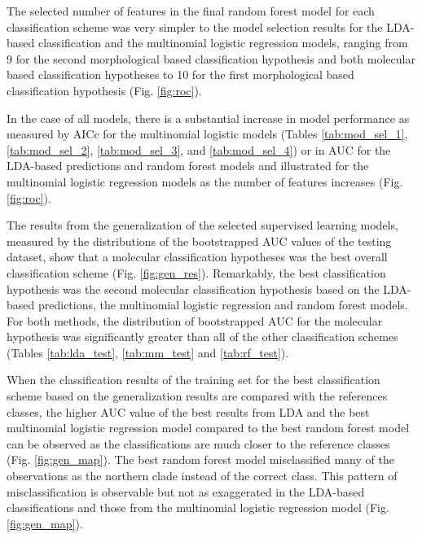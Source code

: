\documentclass[12pt,letterpaper]{article}\usepackage{graphicx, color}
\begin{document}



The selected number of features in the final random forest model for each classification scheme was very simpler to the model selection results for the LDA-based classification and the multinomial logistic regression models, ranging from 9 for the second morphological based classification hypothesis and both molecular based classification hypotheses to 10 for the first morphological based classification hypothesis (Fig. \ref{fig:roc}). 


In the case of all models, there is a substantial increase in model performance as measured by AICc for the multinomial logistic models (Tables \ref{tab:mod_sel_1}, \ref{tab:mod_sel_2}, \ref{tab:mod_sel_3}, and \ref{tab:mod_sel_4}) or in AUC for the LDA-based predictions and random forest models and illustrated for the multinomial logistic regression models as the number of features increases (Fig. \ref{fig:roc}). 

The results from the generalization of the selected supervised learning models, measured by the distributions of the bootstrapped AUC values of the testing dataset, show that a molecular classification hypotheses was the best overall classification scheme (Fig. \ref{fig:gen_res}). Remarkably, the best classification hypothesis was the second molecular classification hypothesis based on the LDA-based predictions, the multinomial logistic regression and random forest models. For both methods, the distribution of bootstrapped AUC for the molecular hypothesis was significantly greater than all of the other classification schemes (Tables \ref{tab:lda_test}, \ref{tab:mm_test} and \ref{tab:rf_test}). 


When the classification results of the training set for the best classification scheme based on the generalization results are compared with the references classes, the higher AUC value of the best results from LDA and the best multinomial logistic regression model compared to the best random forest model can be observed as the classifications are much closer to the reference classes (Fig. \ref{fig:gen_map}). The best random forest model misclassified many of the observations as the northern clade instead of the correct class. This pattern of misclassification is observable but not as exaggerated in the LDA-based classifications and those from the multinomial logistic regression model (Fig. \ref{fig:gen_map}).
\end{document}
